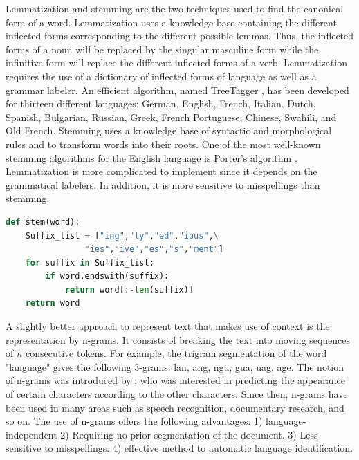 Lemmatization and stemming are the two techniques used to find the canonical form of a word. Lemmatization uses a knowledge base containing the different inflected forms corresponding to the different possible lemmas. Thus, the inflected forms of a noun will be replaced by the singular masculine form while the infinitive form will replace the different inflected forms of a verb. Lemmatization requires the use of a dictionary of inflected forms of language as well as a grammar labeler. An efficient algorithm, named TreeTagger \citep{schmid1994probabilistic}, has been developed for thirteen different languages: German, English, French, Italian, Dutch, Spanish, Bulgarian, Russian, Greek, French Portuguese, Chinese, Swahili, and Old French. Stemming uses a knowledge base of syntactic and morphological rules and to transform words into their roots. One of the most well-known stemming algorithms for the English language is Porter's algorithm \citep{porter1980algorithm}. Lemmatization is more complicated to implement since it depends on the grammatical labelers. In addition, it is more sensitive to misspellings than stemming.

\begin{lstlisting}[language=Python, caption=Python example]
def stem(word):
    Suffix_list = ["ing","ly","ed","ious",\
                "ies","ive","es","s","ment"]
    for suffix in Suffix_list:
        if word.endswith(suffix):
            return word[:-len(suffix)]
    return word
\end{lstlisting}


A slightly better approach to represent text that makes use of context is the representation by n-grams. It consists of breaking the text into moving sequences of $n$ consecutive tokens. For example, the trigram segmentation of the word "language" gives the following 3-grams: lan, ang, ngu, gua, uag, age. The notion of n-grams was introduced by  \citep{shannon1948mathematical}; who was interested in predicting the appearance of certain characters according to the other characters. Since then, n-grams have been used in many areas such as speech recognition, documentary research, and so on. The use of n-grams offers the following advantages: 1) language-independent 2) Requiring no prior segmentation of the document. 3) Less sensitive to misspellings. 4) effective method to automatic language identification.



